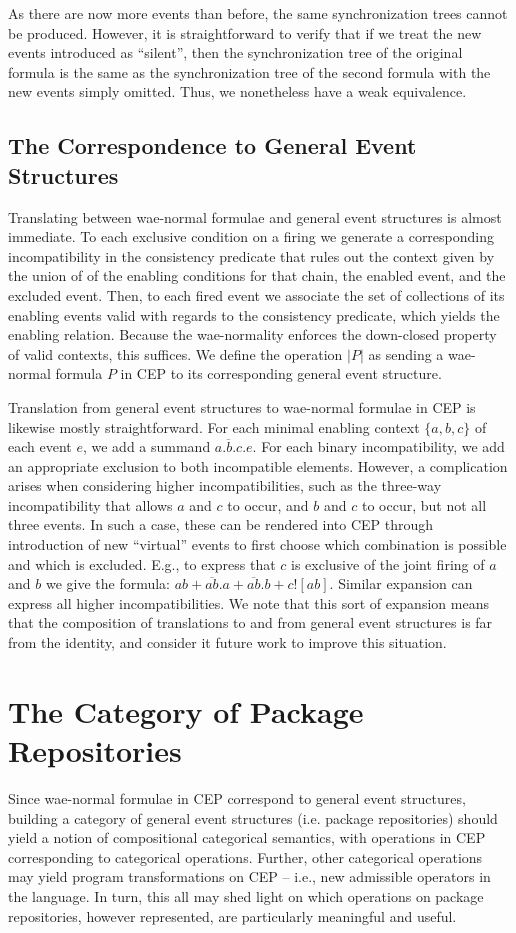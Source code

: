 \documentclass[hoptionsi,review,screen,format=sigconf]{acmart}
\theoremstyle{definition}
\begin{document}
As there are now more events than before, the same synchronization trees cannot be produced. However, it is straightforward to verify that if we treat the new events introduced as ``silent'', then the synchronization tree of the original formula is the same as the synchronization tree of the second formula with the new events simply omitted. Thus, we nonetheless have a weak equivalence.

\subsection{The Correspondence to General Event Structures}

Translating between wae-normal formulae and general event structures is almost immediate. To each exclusive condition on a firing we generate a corresponding incompatibility in the consistency predicate that rules out the context given by the union of of the enabling conditions for that chain, the enabled event, and the excluded event. Then, to each fired event we associate the set of collections of its enabling events valid with regards to the consistency predicate, which yields the enabling relation. Because the wae-normality enforces the down-closed property of valid contexts, this suffices. We define the operation \(|P|\) as sending a wae-normal formula \(P\) in CEP to its corresponding general event structure. 

Translation from general event structures to wae-normal formulae in CEP is likewise mostly straightforward. For each minimal enabling context \(\{a,b,c\}\) of each event \(e\), we add a summand \(\overline{a.b.c}.e\). For each binary incompatibility, we add an appropriate exclusion to both incompatible elements. However, a complication arises when considering higher incompatibilities, such as the three-way incompatibility that allows \(a\) and \(c\) to occur, and \(b\) and \(c\) to occur, but not all three events. In such a case, these can be rendered into CEP through introduction of new ``virtual'' events to first choose which combination is possible and which is excluded. E.g., to express that \(c\) is exclusive of the joint firing of \(a\) and \(b\) we give the formula: \(ab + \overline{ab}.a + \overline{ab}.b + c![ab]\). Similar expansion can express all higher incompatibilities. We note that this sort of expansion means that the composition of translations to and from general event structures is far from the identity, and consider it future work to improve this situation.

\section{The Category of Package Repositories}
Since wae-normal formulae in CEP correspond to general event structures, building a category of general event structures (i.e. package repositories) should yield a notion of compositional categorical semantics, with operations in CEP corresponding to categorical operations. Further, other categorical operations may yield program transformations on CEP -- i.e., new admissible operators in the language. In turn, this all may shed light on which operations on package repositories, however represented, are particularly meaningful and useful.
\end{document}
